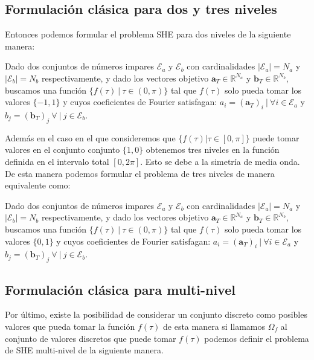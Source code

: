 \subsection{Formulación clásica para dos y tres niveles}
Entonces podemos formular el problema SHE para dos niveles de la siguiente manera:

\begin{problem}\label{SHEp}
    Dado dos conjuntos de números impares $\mathcal{E}_a$ y $\mathcal{E}_b$ con cardinalidades $|\mathcal{E}_a| = N_a$ y  $|\mathcal{E}_b| = N_b$ respectivamente, y dado los vectores objetivo $\bm{a}_T  \in \mathbb{R}^{N_a}$ y $\bm{b}_T  \in \mathbb{R}^{N_b}$, buscamos una función  $\{f(\tau ) \ | \ \tau \in (0,\pi)\}$ tal que $f(\tau)$ solo pueda tomar los valores  $\{-1,1\}$ y cuyos coeficientes de Fourier satisfagan: $ a_i = (\bm{a}_T)_i \ | \ \forall i \in \mathcal{E}_a$ y  $b_j = (\bm{b}_T)_j \ \forall \ | \  j \in \mathcal{E}_b$. 
\end{problem}


Además en el caso en el que  consideremos que  $\{f(\tau) | \tau \in [0,\pi]\}$ puede tomar valores en el conjunto conjunto $\{1,0\}$ obtenemos tres niveles en la función definida en el intervalo total $[0,2\pi]$. Esto se debe a la simetría de media onda. De esta manera podemos formular el problema de tres niveles de manera equivalente como:

\begin{problem}\label{SHEp}
    Dado dos conjuntos de números impares $\mathcal{E}_a$ y $\mathcal{E}_b$ con cardinalidades $|\mathcal{E}_a| = N_a$ y  $|\mathcal{E}_b| = N_b$ respectivamente, 
    y dado los vectores objetivo $\bm{a}_T  \in \mathbb{R}^{N_a}$ y $\bm{b}_T  \in \mathbb{R}^{N_b}$, 
    buscamos una función  $\{f(\tau ) \ | \ \tau \in (0,\pi)\}$ tal que $f(\tau)$ solo pueda tomar los valores  $\{0,1\}$ y cuyos coeficientes de Fourier satisfagan: $ a_i = (\bm{a}_T)_i \ | \ \forall i \in \mathcal{E}_a$ y  $b_j = (\bm{b}_T)_j \ \forall \ | \  j \in \mathcal{E}_b$. 
\end{problem}


\subsection{Formulación clásica para multi-nivel}

Por último, existe la posibilidad de considerar un conjunto  discreto como posibles valores que pueda tomar la función $f(\tau)$ de esta manera si llamamos $\Omega_f$ al conjunto de valores discretos que puede tomar $f(\tau)$ podemos definir el problema de SHE multi-nivel de la siguiente manera.

